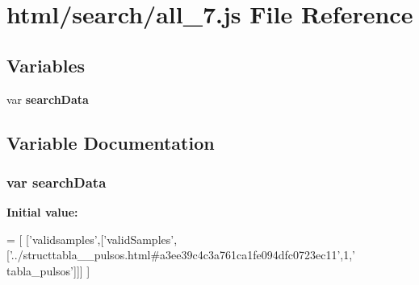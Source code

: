 \section{html/search/all\+\_\+7.js File Reference}
\label{all__7_8js}
\subsection*{Variables}
\begin{DoxyCompactItemize}
\item 
var {\bf search\+Data}
\end{DoxyCompactItemize}


\subsection{Variable Documentation}
\subsubsection[{search\+Data}]{\setlength{\rightskip}{0pt plus 5cm}var search\+Data}\label{all__7_8js_ad01a7523f103d6242ef9b0451861231e}
{\bfseries Initial value\+:}
\begin{DoxyCode}
=
[
  [\textcolor{stringliteral}{'validsamples'},[\textcolor{stringliteral}{'validSamples'},[\textcolor{stringliteral}{'../structtabla\_\_pulsos.html#a3ee39c4c3a761ca1fe094dfc0723ec11'},1,\textcolor{stringliteral}{'
      tabla\_pulsos'}]]]
]
\end{DoxyCode}
